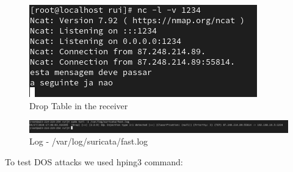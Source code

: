 \documentclass{article}
\begin{document}
\begin{itemize}
\texttt{}\par
\begin{figure}[H]
    \centering
    \includegraphics[scale=0.5]{suricata/sur_sqli_1eq1_internal.png}
    \caption{Drop Table in the receiver}
    \label{fig:network-arc}
\end{figure}


\texttt{}\par
\begin{figure}[H]
    \centering
    \includegraphics[scale=0.45]{suricata/sur_sqli_1eq1_log.png}
    \caption{Log - /var/log/suricata/fast.log}
    \label{fig:network-arc}
\end{figure}
\end{itemize}


To test DOS attacks we used hping3 command:
\end{document}
